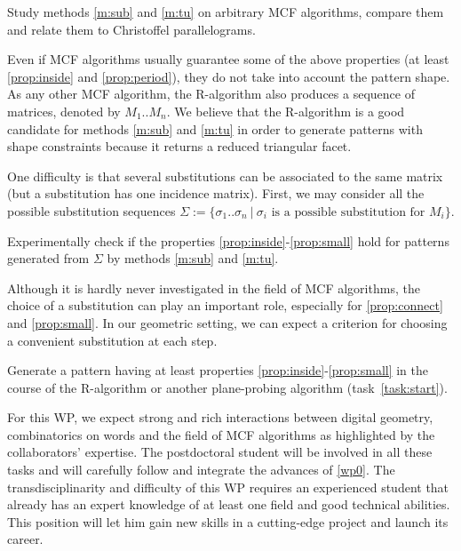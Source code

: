 \begin{Task}
  \label{task:genmeth}
  Study methods \ref{m:sub} and \ref{m:tu} on arbitrary MCF algorithms,
  compare them and relate them to Christoffel parallelograms.   
\end{Task}

Even if MCF algorithms usually guarantee some of the above properties
(at least \ref{prop:inside} and \ref{prop:period}),
they do not take into account the pattern shape. As any other MCF algorithm, the R-algorithm
also produces a sequence of matrices, denoted by $M_1..M_n$. We believe that the R-algorithm
is a good candidate for methods \ref{m:sub} and \ref{m:tu} in order to generate patterns with shape
constraints because it returns a reduced triangular facet.

One difficulty is that several substitutions can be associated to the same matrix
(but a substitution has one incidence matrix). First, we may consider all the possible
substitution sequences
$\Sigma := \{ \sigma_1..\sigma_n \ | \ \sigma_i \text{ is a possible substitution for } M_i \}$.

\begin{Task}
  \label{task:genexp}
  Experimentally check if the properties \ref{prop:inside}-\ref{prop:small}
  hold for patterns generated from $\Sigma$ by methods \ref{m:sub} and \ref{m:tu}.  
\end{Task}

Although it is hardly never investigated in the field of MCF algorithms, the choice of a
substitution can play an important role, especially for \ref{prop:connect} and \ref{prop:small}.
In our geometric setting, we can expect a criterion for choosing a convenient substitution at each step. 

\begin{Task}
  \label{task:genpat}
  Generate a pattern having at least properties \ref{prop:inside}-\ref{prop:small} in the course of
  the R-algorithm or another plane-probing algorithm (task~\ref{task:start}). 
\end{Task}

For this WP, we expect strong and rich interactions between digital geometry, combinatorics on words
and the field of MCF algorithms as highlighted by the collaborators' expertise. The postdoctoral
student will be involved in all these tasks and will carefully follow and integrate the advances
of \ref{wp0}. The transdisciplinarity and difficulty of this WP requires an experienced student
that already has an expert knowledge of at least one field and good technical abilities. This
position will let him gain new skills in a cutting-edge project and launch its career.  

